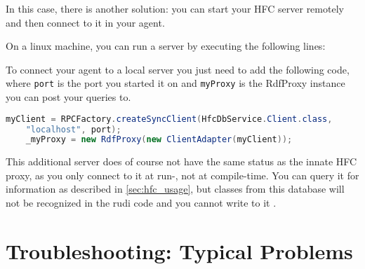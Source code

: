In this case, there is another solution: you can start your HFC server remotely and then connect to it in your \vonda agent.

On a linux machine, you can run a server by executing the following lines:

To connect your \vonda agent to a local server you just need to add the following code, where \texttt{port} is the port you started it on and \texttt{myProxy} is the RdfProxy instance you can post your queries to.

\begin{center}
	\begin{lstlisting}[language=Java]
	myClient = RPCFactory.createSyncClient(HfcDbService.Client.class,
	"localhost", port);
	_myProxy = new RdfProxy(new ClientAdapter(myClient));
	\end{lstlisting}
\end{center}

This additional server does of course not have the same status as the innate HFC proxy, as you only connect to it at run-, not at compile-time. You can query it for information as described in \ref{sec:hfc_usage}, but classes from this database will not be recognized in the rudi code and you cannot write to it . 

\section{Troubleshooting: Typical Problems}

